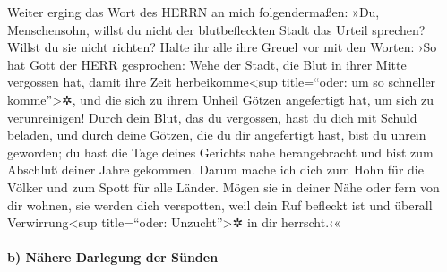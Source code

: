 Weiter erging das Wort des HERRN an mich folgendermaßen:
»Du, Menschensohn, willst du nicht der blutbefleckten
Stadt das Urteil sprechen? Willst du sie nicht richten? Halte ihr alle
ihre Greuel vor mit den Worten: ›So hat Gott der HERR
gesprochen: Wehe der Stadt, die Blut in ihrer Mitte vergossen hat, damit
ihre Zeit herbeikomme\textless sup title=``oder: um so schneller
komme''\textgreater✲, und die sich zu ihrem Unheil Götzen angefertigt
hat, um sich zu verunreinigen! Durch dein Blut, das du
vergossen, hast du dich mit Schuld beladen, und durch deine Götzen, die
du dir angefertigt hast, bist du unrein geworden; du hast die Tage
deines Gerichts nahe herangebracht und bist zum Abschluß deiner Jahre
gekommen. Darum mache ich dich zum Hohn für die Völker und zum Spott für
alle Länder. Mögen sie in deiner Nähe oder fern von dir
wohnen, sie werden dich verspotten, weil dein Ruf befleckt ist und
überall Verwirrung\textless sup title=``oder: Unzucht''\textgreater✲ in
dir herrscht.‹«

\hypertarget{b-nuxe4here-darlegung-der-suxfcnden}{%
\paragraph{b) Nähere Darlegung der
Sünden}\label{b-nuxe4here-darlegung-der-suxfcnden}}

